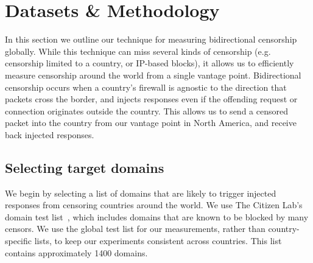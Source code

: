 \section{Datasets \& Methodology}\label{sec:methodology}

In this section we outline our technique for measuring bidirectional censorship
globally. While this technique can miss several kinds of censorship (e.g.
censorship limited to a country, or IP-based blocks), it allows us to
efficiently measure censorship around the world from a single vantage point.
Bidirectional censorship occurs when a country's firewall is agnostic to the
direction that packets cross the border, and injects responses even if the
offending request or connection originates outside the country. This allows us
to send a censored packet into the country from our vantage point in
North America, and receive back injected responses.


\FigProbeSend

\subsection{Selecting target domains}
\label{sec:methodology:domains}
We begin by selecting a list of domains that are likely to trigger injected
responses from censoring countries around the world.
We use The Citizen Lab's~\cite{TheCitiz6:online} domain test
list~\cite{testlist}, which includes domains that are known to be blocked by
many censors. We use the global test list for our measurements, rather than
country-specific lists, to keep our experiments consistent across countries.
This list contains approximately 1400 domains.



